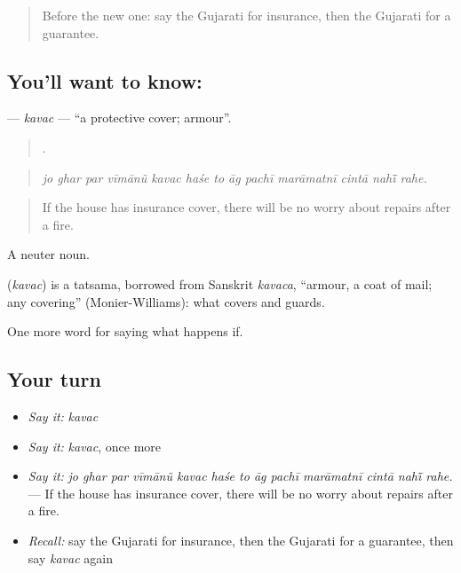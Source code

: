 \label{lesson:GU-C372-kavac}



\begin{quote}
Before the new one: say the Gujarati for insurance, then the Gujarati for a guarantee.
\end{quote}

\subsection*{You'll want to know: }
\textbf{} — \emph{kavac} — \textquotedblleft{}a protective cover; armour\textquotedblright{}.

\begin{quote}
            .
\end{quote}

\begin{quote}
\emph{jo ghar par vīmānũ kavac haśe to āg pachī marāmatnī cintā nahī̃ rahe.}
\end{quote}

\begin{quote}
If the house has insurance cover, there will be no worry about repairs after a fire.
\end{quote}

A neuter noun.

\begin{cousinweb}
\textbf{} (\emph{kavac}) is a tatsama, borrowed from Sanskrit \emph{kavaca}, \textquotedblleft{}armour, a coat of mail; any covering\textquotedblright{} (Monier-Williams): what covers and guards.
\end{cousinweb}

\begin{grammarlens}[title={What you've built}]
One more word for saying what happens if.
\end{grammarlens}

\subsection*{Your turn}
\begin{itemize}
\raggedright
  \item \emph{Say it:} \emph{kavac}
  \item \emph{Say it:} \emph{kavac}, once more
  \item \emph{Say it:} \emph{jo ghar par vīmānũ kavac haśe to āg pachī marāmatnī cintā nahī̃ rahe.} — If the house has insurance cover, there will be no worry about repairs after a fire.
  \item \emph{Recall:} say the Gujarati for insurance, then the Gujarati for a guarantee, then say \emph{kavac} again
\end{itemize}

